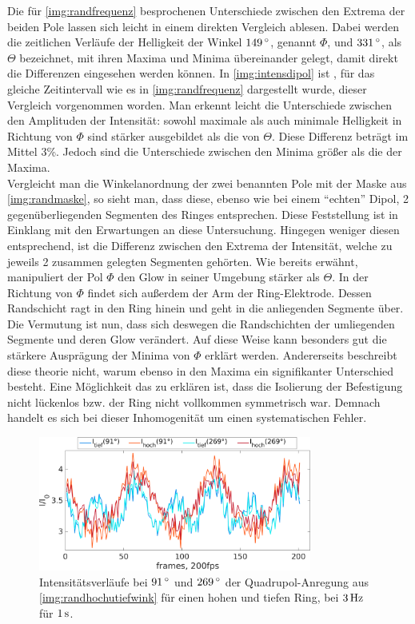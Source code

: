 \documentclass[numbers=noenddot,a4paper,notitlepage,twoside,BCOR15mm]{scrbook}
\newcommand{\degree}{^\circ}
\begin{document}
					Die für \ref{img:randfrequenz} besprochenen Unterschiede zwischen den Extrema der beiden Pole lassen sich leicht in einem direkten Vergleich ablesen. Dabei werden die zeitlichen Verläufe der Helligkeit der Winkel $\unit[149]{\degree}$, genannt $\Phi$, und $\unit[331]{\degree}$, als $\Theta$ bezeichnet, mit ihren Maxima und Minima übereinander gelegt, damit direkt die Differenzen eingesehen werden können. In \ref{img:intensdipol} ist , für das gleiche Zeitintervall wie es in \ref{img:randfrequenz} dargestellt wurde, dieser Vergleich vorgenommen worden. Man erkennt leicht die Unterschiede zwischen den Amplituden der Intensität: sowohl maximale als auch minimale Helligkeit in Richtung von $\Phi$ sind stärker ausgebildet als die von $\Theta$. Diese Differenz beträgt im Mittel 3\%. Jedoch sind die Unterschiede zwischen den Minima größer als die der Maxima.\\
					Vergleicht man die Winkelanordnung der zwei benannten Pole mit der Maske aus \ref{img:randmaske}, so sieht man, dass diese, ebenso wie bei einem "`echten"' Dipol, 2 gegenüberliegenden Segmenten des Ringes entsprechen. Diese Feststellung ist in Einklang mit den Erwartungen an diese Untersuchung. Hingegen weniger diesen entsprechend, ist die Differenz zwischen den Extrema der Intensität, welche zu jeweils 2 zusammen gelegten Segmenten gehörten. Wie bereits erwähnt, manipuliert der Pol $\Phi$ den Glow in seiner Umgebung stärker als $\Theta$. In der Richtung von $\Phi$ findet sich außerdem der Arm der Ring-Elektrode. Dessen Randschicht ragt in den Ring hinein und geht in die anliegenden Segmente über. Die Vermutung ist nun, dass sich deswegen die Randschichten der umliegenden Segmente und deren Glow verändert. Auf diese Weise kann besonders gut die stärkere Ausprägung der Minima von $\Phi$ erklärt werden. Andererseits beschreibt diese theorie nicht, warum ebenso in den Maxima ein signifikanter Unterschied besteht. Eine Möglichkeit das zu erklären ist, dass die Isolierung der Befestigung nicht lückenlos bzw. der Ring nicht vollkommen symmetrisch war. Demnach handelt es sich bei dieser Inhomogenität um einen systematischen Fehler.

						\begin{figure}[!b]
							\centering
							\includegraphics[width=0.8\textwidth,height=0.45\textwidth]{figs/auswertung/plasmaglw/intens270u90hochutiefquad3Hz1sek.png}
							\caption{Intensitätsverläufe bei $\unit[91]{\degree}$ und $\unit[269]{\degree}$ der Quadrupol-Anregung aus \ref{img:randhochutiefwink} für einen hohen und tiefen Ring, bei $\unit[3]{Hz}$ für $\unit[1]{s}$. }
							\label{img:intensquadhochutief}
						\end{figure}
\end{document}
